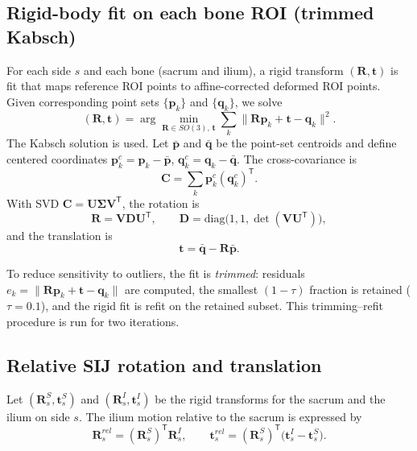 \subsection{Rigid-body fit on each bone ROI (trimmed Kabsch)}
For each side $s$ and each bone (sacrum and ilium), a rigid transform $(\mathbf{R},\mathbf{t})$ is fit that maps reference ROI points to affine-corrected deformed ROI points.
Given corresponding point sets $\{\mathbf{p}_k\}$ and $\{\mathbf{q}_k\}$, we solve
\begin{equation}
(\mathbf{R},\mathbf{t})
=
\arg\min_{\mathbf{R}\in SO(3),\,\mathbf{t}}
\sum_{k}\|\mathbf{R}\mathbf{p}_k+\mathbf{t}-\mathbf{q}_k\|^2.
\end{equation}
The Kabsch solution is used.
Let $\bar{\mathbf{p}}$ and $\bar{\mathbf{q}}$ be the point-set centroids and define centered coordinates
$\mathbf{p}^c_k=\mathbf{p}_k-\bar{\mathbf{p}}$, $\mathbf{q}^c_k=\mathbf{q}_k-\bar{\mathbf{q}}$.
The cross-covariance is
\begin{equation}
\mathbf{C}=\sum_k \mathbf{p}^c_k(\mathbf{q}^c_k)^\mathsf{T}.
\end{equation}
With SVD $\mathbf{C}=\mathbf{U}\mathbf{\Sigma}\mathbf{V}^\mathsf{T}$, the rotation is
\begin{equation}
\mathbf{R}=\mathbf{V}\mathbf{D}\mathbf{U}^\mathsf{T},
\qquad
\mathbf{D}=\mathrm{diag}\big(1,1,\det(\mathbf{V}\mathbf{U}^\mathsf{T})\big),
\end{equation}
and the translation is
\begin{equation}
\mathbf{t}=\bar{\mathbf{q}}-\mathbf{R}\bar{\mathbf{p}}.
\end{equation}

To reduce sensitivity to outliers, the fit is \emph{trimmed}:
residuals $e_k=\|\mathbf{R}\mathbf{p}_k+\mathbf{t}-\mathbf{q}_k\|$ are computed,
the smallest $(1-\tau)$ fraction is retained ($\tau=0.1$), and the rigid fit is refit on the retained subset.
This trimming--refit procedure is run for two iterations.

\subsection{Relative SIJ rotation and translation}
Let $(\mathbf{R}^{S}_s,\mathbf{t}^{S}_s)$ and $(\mathbf{R}^{I}_s,\mathbf{t}^{I}_s)$ be the rigid transforms for the sacrum and the ilium on side $s$.
The ilium motion relative to the sacrum is expressed by
\begin{equation}
\mathbf{R}^{rel}_s=(\mathbf{R}^{S}_s)^\mathsf{T}\mathbf{R}^{I}_s,
\qquad
\mathbf{t}^{rel}_s=(\mathbf{R}^{S}_s)^\mathsf{T}\big(\mathbf{t}^{I}_s-\mathbf{t}^{S}_s\big).
\end{equation}

